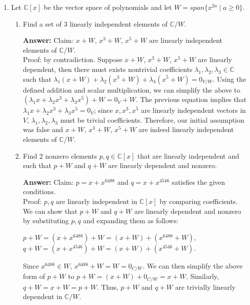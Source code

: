\documentclass{article}
\begin{document}
\begin{enumerate}
      \item
            Let $\mathbb{C}[x]$ be the vector space of polynomials and let $W=span\{x^{2a} \mid a \geq 0\}$.
            \begin{enumerate}
                  \item Find a set of 3 linearly independent elements of $\mathbb{C}/W$.

                        \textbf{Answer: } Claim: $x+W$, $x^3+W$, $x^5+W$ are linearly independent elements of $\mathbb{C}/W$. \\
                        Proof: by contradiction. Suppose $x+W$, $x^3+W$, $x^5+W$ are linearly dependent, then there must exists nontrivial coefficients $\lambda_1, \lambda_2, \lambda_3 \in \mathbb{C}$ such that $\lambda_1(x+W)+\lambda_2(x^3+W)+\lambda_3(x^5+W)=0_{V/W}$. Using the defined addition and scalar multiplication, we can simplify the above to $(\lambda_1 x + \lambda_2 x^3 + \lambda_3 x^5) + W = 0_V+W$. The previous equation implies that $\lambda_1 x + \lambda_2 x^3 + \lambda_3 x^5 = 0_V$; since $x, x^3, x^5$ are linearly independent vectors in $V$, $\lambda_1,\lambda_2,\lambda_3$ must be trivial coefficients. Therefore, our initial assumption was false and $x+W$, $x^3+W$, $x^5+W$ are indeed linearly independent elements of $\mathbb{C}/W$.

                  \item Find 2 nonzero elements $p,q \in \mathbb{C}[x]$ that are linearly independent and such that $p+W$ and $q+W$ are linearly dependent and nonzero.

                        \textbf{Answer: } Claim: $p=x+x^{6488}$ and $q=x+x^{4546}$ satisfies the given conditions. \\
                        Proof: $p,q$ are linearly independent in $\mathbb{C}[x]$ by comparing coefficients. We can show that $p+W$ and $q+W$ are linearly dependent and nonzero by substituting $p,q$ and expanding them as follows:
                        \begin{center}
                        $p+W=(x+x^{6488})+W=(x+W)+(x^{6488}+W)$, \\
                        $q+W=(x+x^{4546})+W=(x+W)+(x^{4546}+W)$. \\
                        \end{center}
                        Since $x^{6488} \in W$, $x^{6488}+W=W=0_{C/W}$. We can then  simplify the above form of $p+W$ to $p+W=(x+W)+0_{C/W}=x+W$. Similarly, $q+W=x+W=p+W$. Thus, $p+W$ and $q+W$ are trivially linearly dependent in $\mathbb{C}/W$.

            \end{enumerate}

\end{enumerate}
\end{document}
